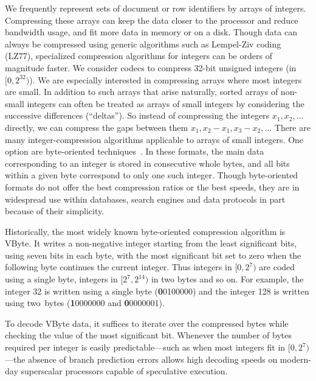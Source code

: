\documentclass[compress]{elsarticle}
\newcommand{\vbyte}{VByte}
\begin{document}
We frequently represent sets of document or row identifiers by arrays of integers.
Compressing these arrays can keep the data closer to
the processor and reduce bandwidth usage, and fit more data in memory or on a disk.
Though data can always be compressed using generic algorithms such as
Lempel-Ziv coding (LZ77), specialized compression algorithms
for integers can be orders of magnitude faster.
We consider codecs to compress 32-bit unsigned integers (in $[0, 2^{32})$).
 We are especially interested in compressing arrays where most integers
are small. In addition to such arrays that arise naturally, sorted arrays of non-small integers can often be treated as arrays of small integers by considering the  successive differences (``deltas''). So 
instead of compressing the integers $x_1, x_2, \ldots$ directly, we can compress the gaps between them
$x_1, x_2-x_1, x_3-x_2, \ldots$
There are many integer-compression algorithms applicable to
arrays of small integers.
One option are byte-oriented techniques~\cite{Stepanov:2011:SDP:2063576.2063627}. In these formats, the main data
corresponding to an integer is stored in
consecutive whole bytes, and all bits within a given byte correspond to only one such integer.
Though byte-oriented formats do not offer the best compression ratios or the best speeds, they are in widespread use within databases, search engines and data protocols in part because of their simplicity. 




Historically, the most widely known byte-oriented compression algorithm is \vbyte{}.
It writes a non-negative integer starting from the least significant bits, using  seven bits in each byte, with the most significant bit set to zero when the following byte continues the current integer.   
Thus integers in  $[0,2^7)$ are coded using a single byte, integers in $[2^7, 2^{14})$ in two bytes and so on.
For example, the integer 32 is written using a single byte (\textbf{0}0100000)
and the integer 128 is written using two~bytes (\textbf{1}0000000 and \textbf{0}0000001).

To decode \vbyte{} data, it suffices to iterate
over the compressed bytes while checking the value of the most significant bit.
Whenever the number of bytes required per integer is easily predictable---such as when most integers fit in $[0,2^7)$---the absence of branch prediction errors allows high decoding speeds on modern-day superscalar processors capable of speculative execution.
\end{document}
